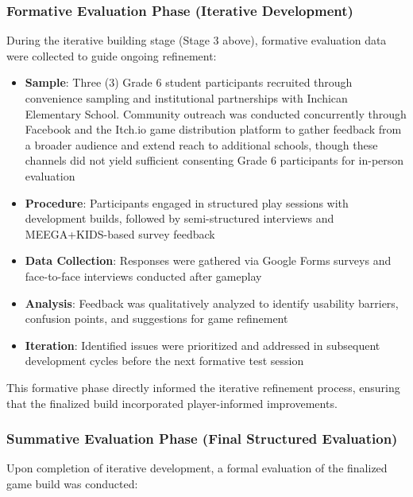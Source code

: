 \subsubsection{Formative Evaluation Phase (Iterative Development)}

During the iterative building stage (Stage 3 above), formative evaluation data were collected to guide ongoing refinement:

\begin{itemize}
    \item \textbf{Sample}: Three (3) Grade 6 student participants recruited through convenience sampling and institutional partnerships with Inchican Elementary School. Community outreach was conducted concurrently through Facebook and the Itch.io game distribution platform to gather feedback from a broader audience and extend reach to additional schools, though these channels did not yield sufficient consenting Grade 6 participants for in-person evaluation
    \item \textbf{Procedure}: Participants engaged in structured play sessions with development builds, followed by semi-structured interviews and MEEGA+KIDS-based survey feedback \cite{vonWangenheim2020}
    \item \textbf{Data Collection}: Responses were gathered via Google Forms surveys and face-to-face interviews conducted after gameplay
    \item \textbf{Analysis}: Feedback was qualitatively analyzed to identify usability barriers, confusion points, and suggestions for game refinement
    \item \textbf{Iteration}: Identified issues were prioritized and addressed in subsequent development cycles before the next formative test session
\end{itemize}

This formative phase directly informed the iterative refinement process, ensuring that the finalized build incorporated player-informed improvements.

\subsubsection{Summative Evaluation Phase (Final Structured Evaluation)}

Upon completion of iterative development, a formal evaluation of the finalized game build was conducted:

